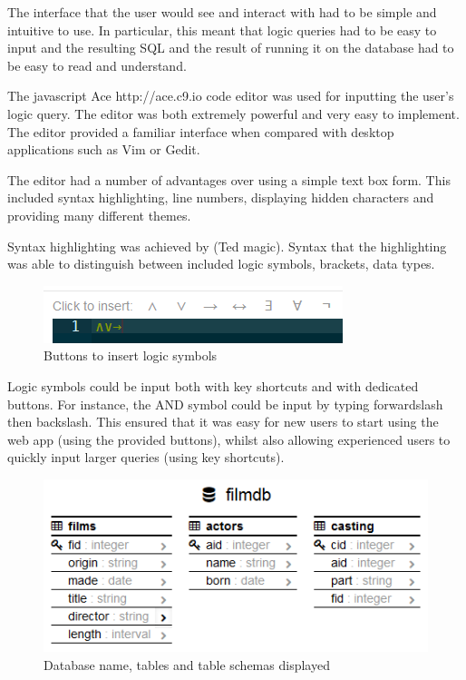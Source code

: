 \documentclass[a4paper, 11pt]{article}
\begin{document}
      The interface that the user would see and interact with had to be simple
      and intuitive to use. In particular, this meant that logic queries had to
      be easy to input and the resulting SQL and the result of running it on the
      database had to be easy to read and understand.

      The javascript Ace http://ace.c9.io code editor was used for inputting the
      user's logic query. The editor was both extremely powerful and very easy
      to implement. The editor provided a familiar interface when compared with
      desktop applications such as Vim or Gedit.

      The editor had a number of advantages over using a simple text box form.
      This included syntax highlighting, line numbers, displaying hidden
      characters and providing many different themes.

      Syntax highlighting was achieved by (Ted magic). Syntax that the
      highlighting was able to distinguish between included logic symbols,
      brackets, data types.

      \begin{figure}[h!]
        \centering
        \includegraphics[]{images/LogicSymbols.png}
        \caption{Buttons to insert logic symbols}
      \end{figure}

      Logic symbols could be input both with key shortcuts and with dedicated
      buttons. For instance, the AND symbol could be input by typing
      forwardslash then backslash. This ensured that it was easy for new users
      to start using the web app (using the provided buttons), whilst also
      allowing experienced users to quickly input larger queries (using key
      shortcuts).

      \begin{figure}[h!]
        \centering
        \includegraphics[]{images/Schema.png}
        \caption{Database name, tables and table schemas displayed}
      \end{figure}
\end{document}
